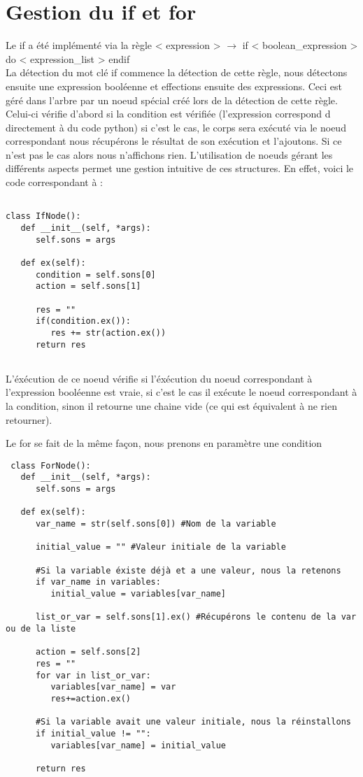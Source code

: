 \documentclass[a4paper,10pt]{article}
\begin{document}
\section{Gestion du \textbf{if} et \textbf{for}}
Le if a été implémenté via la règle < expression > $\rightarrow$ if < boolean\_expression > do < expression\_list > endif \\
La détection du mot clé if commence la détection de cette règle, nous détectons ensuite une expression booléenne et effections ensuite des expressions. Ceci
est géré dans l'arbre par un noeud spécial créé lors de la détection de cette règle. Celui-ci vérifie d'abord si la condition est vérifiée (l'expression correspond d
directement à du code python) si c'est le cas, le corps sera exécuté via le noeud correspondant nous récupérons le résultat de son exécution et l'ajoutons.
Si ce n'est pas le cas alors nous n'affichons rien. L'utilisation de noeuds gérant les différents aspects permet une gestion intuitive de ces structures. En effet,
voici le code correspondant à :
\begin{verbatim}

class IfNode():
   def __init__(self, *args):
      self.sons = args
         
   def ex(self):
      condition = self.sons[0]
      action = self.sons[1]

      res = ""
      if(condition.ex()):
         res += str(action.ex())
      return res
 
\end{verbatim}
L'éxécution de ce noeud vérifie si l'éxécution du noeud correspondant à l'expression booléenne est vraie, si c'est le cas il exécute le noeud correspondant à
la condition, sinon il retourne une chaine vide (ce qui est équivalent à ne rien retourner).

Le for se fait de la même façon, nous prenons en paramètre une condition 
\begin{verbatim}
 class ForNode():
   def __init__(self, *args):
      self.sons = args
         
   def ex(self):
      var_name = str(self.sons[0]) #Nom de la variable

      initial_value = "" #Valeur initiale de la variable

      #Si la variable éxiste déjà et a une valeur, nous la retenons
      if var_name in variables:
         initial_value = variables[var_name]

      list_or_var = self.sons[1].ex() #Récupérons le contenu de la var ou de la liste
      
      action = self.sons[2]
      res = ""
      for var in list_or_var:
         variables[var_name] = var
         res+=action.ex()

      #Si la variable avait une valeur initiale, nous la réinstallons
      if initial_value != "":
         variables[var_name] = initial_value

      return res
\end{verbatim}
\end{document}
